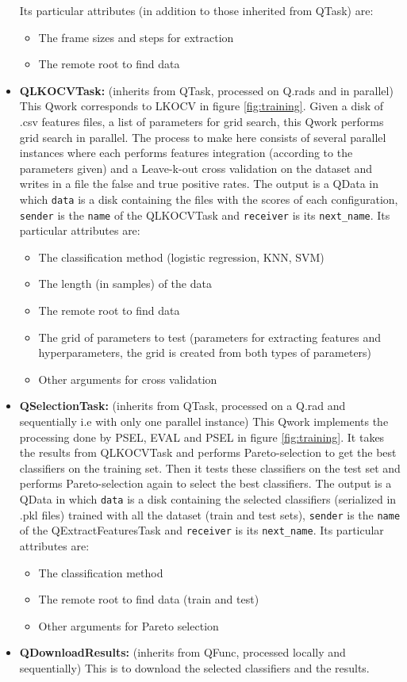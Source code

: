 \documentclass[10pt, conference, compsocconf]{IEEEtran}
\begin{document}
\begin{itemize}
  Its particular attributes (in addition to those inherited from QTask) are: 
  \begin{itemize}
  \item The frame sizes and steps for extraction
  \item The remote root to find data
  \end{itemize}
\item \textbf{QLKOCVTask:} (inherits from QTask, processed on Q.rads and in parallel) This Qwork corresponds to LKOCV in figure \ref{fig:training}. Given a disk of .csv features files, a list of parameters for grid search, this Qwork performs grid search in parallel. The process to make here consists of several parallel instances where each performs features integration (according to the parameters given) and a Leave-k-out cross validation on the dataset and writes in a file the false and true positive rates. The output is a QData in which \texttt{data} is a disk containing the files with the scores of each configuration, \texttt{sender} is the \texttt{name} of the QLKOCVTask and \texttt{receiver} is its \texttt{next\_name}.
  Its particular attributes are: 
  \begin{itemize}
  \item The classification method (logistic regression, KNN, SVM)
  \item The length (in samples) of the data
  \item The remote root to find data
  \item The grid of parameters to test (parameters for extracting features and hyperparameters, the grid is created from both types of parameters)
  \item Other arguments for cross validation
  \end{itemize}
\item \textbf{QSelectionTask:} (inherits from QTask, processed on a Q.rad and sequentially i.e with only one parallel instance) This Qwork 
implements the processing done by PSEL, EVAL and PSEL in figure \ref{fig:training}. It takes the results from QLKOCVTask and performs Pareto-selection to get the best classifiers on the training set. Then it tests these classifiers on the test set and performs Pareto-selection again to select the best classifiers. The output is a QData in which \texttt{data} is a disk containing the selected classifiers (serialized in .pkl files) trained with all the dataset (train and test sets), \texttt{sender} is the \texttt{name} of the QExtractFeaturesTask and \texttt{receiver} is its \texttt{next\_name}.
  Its particular attributes are: 
  \begin{itemize}
  \item The classification method
  \item The remote root to find data (train and test)
  \item Other arguments for Pareto selection
  \end{itemize}
\item \textbf{QDownloadResults:} (inherits from QFunc, processed locally and sequentially) This is to download the selected classifiers and the results.
\end{itemize}
\end{document}
